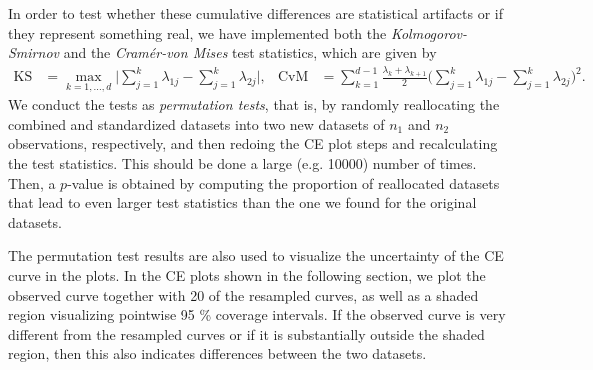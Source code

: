 \documentclass[titlepage,11pt,twoside]{article}
\begin{document}
In order to test whether these cumulative differences are statistical artifacts or if they represent something real, we have implemented both the \emph{Kolmogorov-Smirnov} and the \emph{Cram\'er-von Mises} test statistics, which are given by
\begin{align*}
\text{KS} &= \max_{k=1,\dotsc,d} \bigg\lvert \sum_{j=1}^k \lambda_{1j} - \sum_{j=1}^k \lambda_{2j} \bigg\rvert, &
\text{CvM} &= \sum_{k=1}^{d-1} \frac{\lambda_k + \lambda_{k+1}}{2} \bigg( \sum_{j=1}^k \lambda_{1j} - \sum_{j=1}^k \lambda_{2j} \bigg)^2.
\end{align*}
We conduct the tests as \textit{permutation tests}, that is, by randomly reallocating the combined and standardized datasets into two new datasets of $n_1$ and $n_2$ observations, respectively, and then redoing the CE plot steps and recalculating the test statistics. This should be done a large (e.g. 10000) number of times. Then, a $p$-value is obtained by computing the proportion of reallocated datasets that lead to even larger test statistics than the one we found for the original datasets. 

The permutation test results are also used to visualize the uncertainty of the CE curve in the plots. In the CE plots shown in the following section, we plot the observed curve together with 20 of the resampled curves, as well as a shaded region visualizing pointwise 95 \% coverage intervals. If the observed curve is very different from the resampled curves or if it is substantially outside the shaded region, then this also indicates differences between the two datasets.

\end{document}
